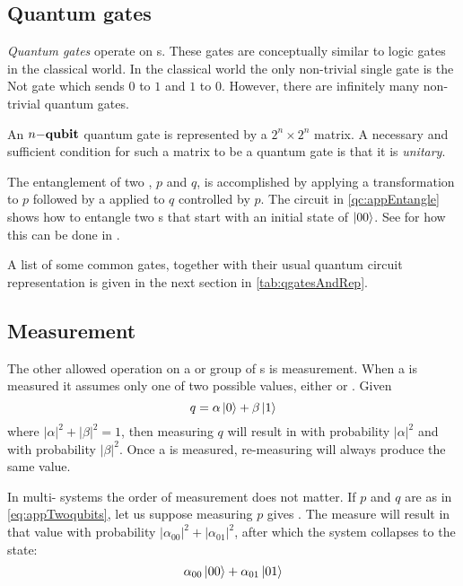 
\subsection{Quantum gates} %
\label{sub:quantum_gates}

\emph{Quantum gates} operate on \qubit{}s. These
gates are conceptually similar to logic gates in the classical world.
 In the
classical world the only non-trivial single
\bit{} gate is the Not gate which
sends $0$ to $1$ and $1$ to $0$. However, there are
infinitely many non-trivial quantum
gates.

An $n{-}\mathbf{{qubit}}{}$ quantum gate is represented by
a $2^n \times 2^n$ matrix. A
necessary and sufficient condition for such a matrix to be
a quantum gate is that it is \emph{unitary}.

The entanglement of two \qubits{}, $p$ and $q$, is accomplished by applying a
\Had{} transformation to $p$ followed by
a \nottr{} applied to $q$ controlled by $p$.
The circuit in
\vref{qc:appEntangle} shows how to entangle two \qubit{}s that start with
an initial state of $\left\vert{00}\right\rangle$. See %
for how this can be done in \lqpl.

A list of some common gates, together with their usual
quantum circuit representation is given in the next section in
 \vref{tab:qgatesAndRep}.



\subsection{Measurement} %
\label{sub:measuerment}


The  other allowed
operation on a \qubit{} or group of \qubit{}s is
measurement. When a  \qubit{} is measured it
assumes only one of two possible values, either  or . Given
\begin{equation}
q=\alpha\left\vert{0}\right\rangle+\beta\left\vert{1}\right\rangle\label{eq:appSinglequbit}
\end{equation}
where $|\alpha|^2+|\beta|^2 = 1$, then measuring $q$ will result in
 with probability $|\alpha|^2$ and  with
probability $|\beta|^2$.
Once a \qubit{} is measured, re-measuring will always produce the same
value.

In multi-\qubit{} systems the order of measurement does not matter.
If $p$ and $q$ are as in \vref{eq:appTwoqubits}, let us suppose measuring $p$
gives  . The measure will result in  that value with probability
$|\alpha_{00}|^2 + |\alpha_{01}|^2$, after which the system
collapses to the state:
\begin{equation}
\alpha_{00}\left\vert{00}\right\rangle + \alpha_{01}\left\vert{01}\right\rangle\label{eq:appCollapsedFirstBit}
\end{equation}


